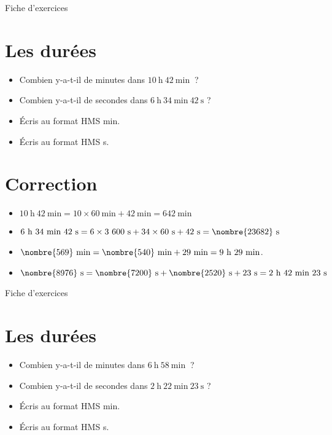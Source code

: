 \documentclass[a4paper,11pt,fleqn]{article}
\begin{document}
\newpage
\setcounter{exo}{0}
\setcounter{section}{0}
\begin{center}
	{\huge Fiche d'exercices } 	
\end{center}


\section{Les durées}
\begin{itemize}
  \item Combien y-a-t-il de minutes dans $10~\text{h}~42~\text{min}~$ ?
  \item Combien y-a-t-il de secondes dans $6~\text{h}~34~\text{min}~42~\text{s}$ ?
  \item Écris au format HMS  min.
  \item Écris au format HMS  s.
\end{itemize}

\section{Correction}
\begin{itemize}
 \item $10~\text{h}~42~\text{min}=10\times60~\text{min}+42~\text{min}=642~\text{min}$
  \item $6~\text{h}~34~\text{min}~42~\text{s}=6\times3~600~\text{s}+34\times60~\text{s}+42~\text{s}=\nombre{23682}~\text{s}$
  \item $\nombre{569}~\text{min}=\nombre{540}~\text{min}+29~\text{min}=9~\text{h}~29~\text{min}$.
  \item $\nombre{8976}~\text{s}=\nombre{7200}~\text{s}+\nombre{2520}~\text{s}+23~\text{s}=2~\text{h}~42~\text{min}~23~\text{s}$ \end{itemize}


\newpage
\setcounter{exo}{0}
\setcounter{section}{0}
\begin{center}
	{\huge Fiche d'exercices } 	
\end{center}


\section{Les durées}
\begin{itemize}
  \item Combien y-a-t-il de minutes dans $6~\text{h}~58~\text{min}~$ ?
  \item Combien y-a-t-il de secondes dans $2~\text{h}~22~\text{min}~23~\text{s}$ ?
  \item Écris au format HMS  min.
  \item Écris au format HMS  s.
\end{itemize}
\end{document}
